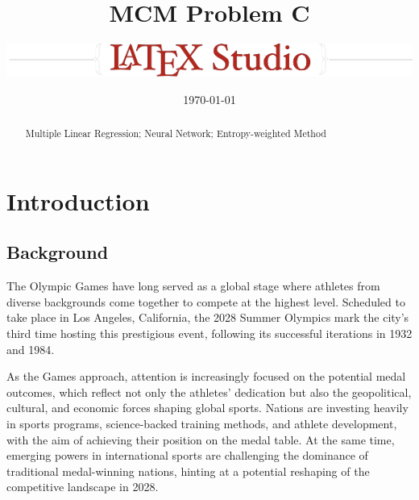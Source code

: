 \documentclass{mcmthesis}
\title{MCM Problem C}
\author{\small \href{https://www.latexstudio.net/}
  {\includegraphics{mcmthesis-logo}}}
\date{\today}
\begin{document}
\begin{abstract}
\par %





\begin{keywords}
Multiple Linear Regression; Neural Network; Entropy-weighted Method
\end{keywords}
\end{abstract}
\maketitle
\tableofcontents
\newpage
\section{Introduction}

\subsection{Background}

The Olympic Games have long served as a global stage where athletes from diverse backgrounds come together to compete at the highest level. Scheduled to take place in Los Angeles, California, the 2028 Summer Olympics mark the city’s third time hosting this prestigious event, following its successful iterations in 1932 and 1984.

As the Games approach, attention is increasingly focused on the potential medal outcomes, which reflect not only the athletes’ dedication but also the geopolitical, cultural, and economic forces shaping global sports. Nations are investing heavily in sports programs, science-backed training methods, and athlete development, with the aim of achieving their position on the medal table. At the same time, emerging powers in international sports are challenging the dominance of traditional medal-winning nations, hinting at a potential reshaping of the competitive landscape in 2028.
\end{document}
